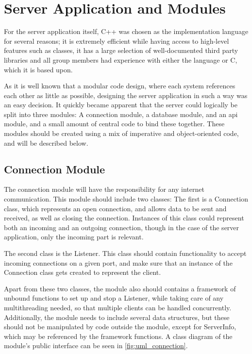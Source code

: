 \section{Server Application and Modules}

For the server application itself, C++ was chosen as the implementation language for several reasons; it is extremely efficient while having access to high-level
features such as classes, it has a large selection of well-documented third party libraries and all group members had experience with either the language or C, which it
is based upon.

As it is well known that a modular code design, where each system references each other as little as possible, designing the server application in such a way
was an easy decision. It quickly became apparent that the server could logically be split into three modules: A connection module, a database module, and an \ac{api} module,
and a small amount of central code to bind these together. These modules should be created using a mix of imperative and object-oriented code, and will be described below.

\subsection{Connection Module}

The connection module will have the responsibility for any internet communication. This module should include two classes: The first is a Connection class,
which represents an open connection, and allows data to be sent and received, as well as closing the connection. Instances of this class could represent both an incoming and an outgoing
connection, though in the case of the server application, only the incoming part is relevant.

The second class is the Listener. This class should contain functionality to accept incoming connections on a given port, and make sure that an instance of the Connection class gets created
to represent the client.

Apart from these two classes, the module also should contains a framework of unbound functions to set up and stop a Listener, while taking care of any multithreading needed, so that multiple
clients can be handled concurrently. Additionally, the module needs to include several data structures, but these should not be manipulated by code outside the module, except for ServerInfo,
which may be referenced by the framework functions. A class diagram of the module's public interface can be seen in \autoref{fig:uml_connection}.

